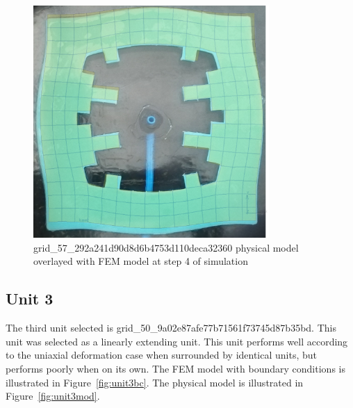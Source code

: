 \begin{figure}[H]
	\centering
	\includegraphics[width=0.8\textwidth]{unit2defover.png}
	\caption[Physical model of unit 2 overlayed with FEM model]{grid\_57\_292a241d90d8d6b4753d110deca32360 physical model overlayed with FEM model at step 4 of simulation}
	\label{fig:unit2over}
\end{figure}

\subsection{Unit 3}

The third unit selected is grid\_50\_9a02e87afe77b71561f73745d87b35bd. This unit was selected as a linearly extending unit. This unit performs well according to the uniaxial deformation case when surrounded by identical units, but performs poorly when on its own. The FEM model with boundary conditions is illustrated in Figure~\ref{fig:unit3bc}. The physical model is illustrated in Figure~\ref{fig:unit3mod}.

